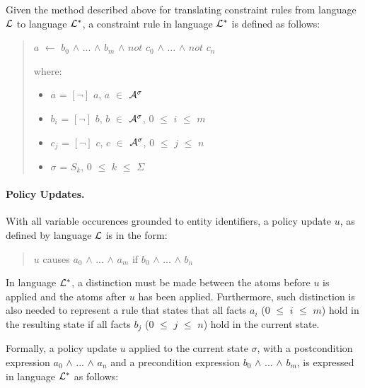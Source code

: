 \documentclass[10pt, twocolumn]{article}
\begin{document}
          Given the method described above for translating constraint rules
          from language ${\cal L}$ to language ${\cal L}^{*}$, a constraint
          rule in language ${\cal L}^{*}$ is defined as follows:

          \begin{quote}
            $a$ $\leftarrow$
            $b_{0}$ $\land$ ... $\land$ $b_{m}$ $\land$
            $not$ $c_{0}$ $\land$ ... $\land$ $not$ $c_{n}$

            where:

            \begin{itemize}
              \item
                $a$ = $[\lnot]$ $a$, $a$ $\in$ ${\cal A}^{\sigma}$
              \item
                $b_{i}$ = $[\lnot]$ $b$, $b$ $\in$ ${\cal A}^{\sigma}$, $0$ $\leq$ $i$ $\leq$ $m$
              \item
                $c_{j}$ = $[\lnot]$ $c$, $c$ $\in$ ${\cal A}^{\sigma}$, $0$ $\leq$ $j$ $\leq$ $n$
              \item
                $\sigma$ = $S_{k}$, $0$ $\leq$ $k$ $\leq$ $\Sigma$
              \end{itemize}
          \end{quote}

        \paragraph{Policy Updates.}

          With all variable occurences grounded to entity identifiers, a
          policy update $u$, as defined by language ${\cal L}$ is in the form:

          \begin{quote}
            $u$ causes $a_{0}$ $\land$ ... $\land$ $a_{m}$ if $b_{0}$ $\land$ ... $\land$ $b_{n}$
          \end{quote}

          In language ${\cal L}^{*}$, a distinction must be made between the
          atoms before $u$ is applied and the atoms after $u$ has been applied.
          Furthermore, such distinction is also needed to represent a rule that
          states that all facts $a_{i}$ ($0$ $\leq$ $i$ $\leq$ $m$) hold in
          the resulting state if all facts $b_{j}$ ($0$ $\leq$ $j$ $\leq$ $n$)
          hold in the current state.

          Formally, a policy update $u$ applied to the current state $\sigma$,
          with a postcondition expression $a_{0}$ $\land$ ... $\land$ $a_{n}$
          and a precondition expression $b_{0}$ $\land$ ... $\land$ $b_{m}$, 
          is expressed in language ${\cal L}^{*}$ as follows:
\end{document}
